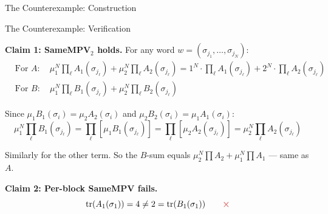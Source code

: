 \documentclass[aspectratio=169,10pt]{beamer}
\begin{document}
\begin{frame}{The Counterexample: Construction}
\begin{center}
\end{center}
\end{frame}

\begin{frame}{The Counterexample: Verification}
\vspace{-0.5em}

\textbf{Claim 1: SameMPV$_2$ holds.}\quad
For any word $w = (\sigma_{j_1}, \dots, \sigma_{j_N})$:
\begin{align*}
  &\text{For } A: \quad
  \mu_1^N \prod_\ell A_1(\sigma_{j_\ell}) + \mu_2^N \prod_\ell A_2(\sigma_{j_\ell})
  = 1^N \cdot \prod_\ell A_1(\sigma_{j_\ell}) + 2^N \cdot \prod_\ell A_2(\sigma_{j_\ell}) \\
  &\text{For } B: \quad
  \mu_1^N \prod_\ell B_1(\sigma_{j_\ell}) + \mu_2^N \prod_\ell B_2(\sigma_{j_\ell})
\end{align*}

\vspace{-0.8em}
Since $\mu_1 B_1(\sigma_i) = \mu_2 A_2(\sigma_i)$ and
$\mu_2 B_2(\sigma_i) = \mu_1 A_1(\sigma_i)$:
\[
  \mu_1^N \prod_\ell B_1(\sigma_{j_\ell})
  = \prod_\ell [\mu_1 B_1(\sigma_{j_\ell})]
  = \prod_\ell [\mu_2 A_2(\sigma_{j_\ell})]
  = \mu_2^N \prod_\ell A_2(\sigma_{j_\ell})
\]

\vspace{-0.2em}
Similarly for the other term. So the $B$-sum equals
$\mu_2^N \prod A_2 + \mu_1^N \prod A_1$ --- same as $A$. \textcolor{leangreen}{\checkmark}

\vspace{0.5em}
\textbf{Claim 2: Per-block SameMPV fails.}\quad
\[
  \tr(A_1(\sigma_1)) = 4 \neq  2 = \tr(B_1(\sigma_1))
  \qquad \textcolor{softred}{\boldsymbol{\times}}
\]

\vspace{0.3em}
\begin{center}
\end{center}
\end{frame}
\end{document}
